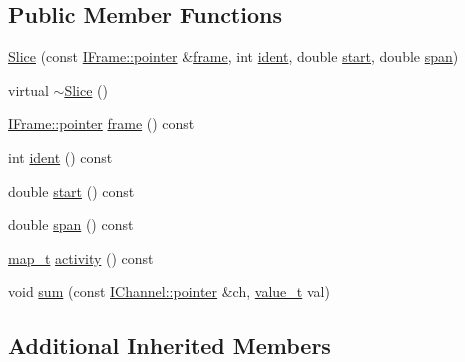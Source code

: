 \subsection*{Public Member Functions}
\begin{DoxyCompactItemize}
\item 
\hyperlink{class_wire_cell_1_1_img_1_1_data_1_1_slice_afb42f4f44780fc228b76a96320e7cb0c}{Slice} (const \hyperlink{class_wire_cell_1_1_i_data_aff870b3ae8333cf9265941eef62498bc}{I\+Frame\+::pointer} \&\hyperlink{class_wire_cell_1_1_img_1_1_data_1_1_slice_acff7cfb312929c31f3e457dfa96d37e6}{frame}, int \hyperlink{class_wire_cell_1_1_img_1_1_data_1_1_slice_af4448bb9ab0b80b591763623ac23850a}{ident}, double \hyperlink{class_wire_cell_1_1_img_1_1_data_1_1_slice_acf8f4a84cbee31e3940c387708348f88}{start}, double \hyperlink{class_wire_cell_1_1_img_1_1_data_1_1_slice_a35e3999928c41c60b3f0e3eb738c29ca}{span})
\item 
virtual \hyperlink{class_wire_cell_1_1_img_1_1_data_1_1_slice_af5eca11ee40a61159787ec35f2f1ed27}{$\sim$\+Slice} ()
\item 
\hyperlink{class_wire_cell_1_1_i_data_aff870b3ae8333cf9265941eef62498bc}{I\+Frame\+::pointer} \hyperlink{class_wire_cell_1_1_img_1_1_data_1_1_slice_acff7cfb312929c31f3e457dfa96d37e6}{frame} () const
\item 
int \hyperlink{class_wire_cell_1_1_img_1_1_data_1_1_slice_af4448bb9ab0b80b591763623ac23850a}{ident} () const
\item 
double \hyperlink{class_wire_cell_1_1_img_1_1_data_1_1_slice_acf8f4a84cbee31e3940c387708348f88}{start} () const
\item 
double \hyperlink{class_wire_cell_1_1_img_1_1_data_1_1_slice_a35e3999928c41c60b3f0e3eb738c29ca}{span} () const
\item 
\hyperlink{class_wire_cell_1_1_i_slice_ac953094751a404827468ca9887736415}{map\+\_\+t} \hyperlink{class_wire_cell_1_1_img_1_1_data_1_1_slice_a7f321316b726582a7d476ecebbdc2dc5}{activity} () const
\item 
void \hyperlink{class_wire_cell_1_1_img_1_1_data_1_1_slice_af68a6a88e7af9a3d478e817c0a3bfe15}{sum} (const \hyperlink{class_wire_cell_1_1_i_data_aff870b3ae8333cf9265941eef62498bc}{I\+Channel\+::pointer} \&ch, \hyperlink{class_wire_cell_1_1_i_slice_a9d6f136d407740183a2c4d2078745a59}{value\+\_\+t} val)
\end{DoxyCompactItemize}
\subsection*{Additional Inherited Members}


